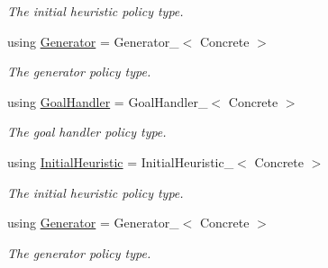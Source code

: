 \begin{DoxyCompactItemize}
\begin{DoxyCompactList}\small\item\em The initial heuristic policy type. \end{DoxyCompactList}\item 
using \hyperlink{structalgorithm_1_1Algorithm_a4b5d0c94b49b586bd31af92ed6ec94ad}{Generator} = Generator\+\_\+$<$ Concrete $>$\hypertarget{structalgorithm_1_1Algorithm_a4b5d0c94b49b586bd31af92ed6ec94ad}{}\label{structalgorithm_1_1Algorithm_a4b5d0c94b49b586bd31af92ed6ec94ad}

\begin{DoxyCompactList}\small\item\em The generator policy type. \end{DoxyCompactList}\item 
using \hyperlink{structalgorithm_1_1Algorithm_af9111b0a505a193a2c4878b710b8ea65}{Goal\+Handler} = Goal\+Handler\+\_\+$<$ Concrete $>$\hypertarget{structalgorithm_1_1Algorithm_af9111b0a505a193a2c4878b710b8ea65}{}\label{structalgorithm_1_1Algorithm_af9111b0a505a193a2c4878b710b8ea65}

\begin{DoxyCompactList}\small\item\em The goal handler policy type. \end{DoxyCompactList}\item 
using \hyperlink{structalgorithm_1_1Algorithm_aa0c111908e844c0ff5cfe78f778bba52}{Initial\+Heuristic} = Initial\+Heuristic\+\_\+$<$ Concrete $>$\hypertarget{structalgorithm_1_1Algorithm_aa0c111908e844c0ff5cfe78f778bba52}{}\label{structalgorithm_1_1Algorithm_aa0c111908e844c0ff5cfe78f778bba52}

\begin{DoxyCompactList}\small\item\em The initial heuristic policy type. \end{DoxyCompactList}\item 
using \hyperlink{structalgorithm_1_1Algorithm_a4b5d0c94b49b586bd31af92ed6ec94ad}{Generator} = Generator\+\_\+$<$ Concrete $>$\hypertarget{structalgorithm_1_1Algorithm_a4b5d0c94b49b586bd31af92ed6ec94ad}{}\label{structalgorithm_1_1Algorithm_a4b5d0c94b49b586bd31af92ed6ec94ad}

\begin{DoxyCompactList}\small\item\em The generator policy type. \end{DoxyCompactList}\end{DoxyCompactItemize}
